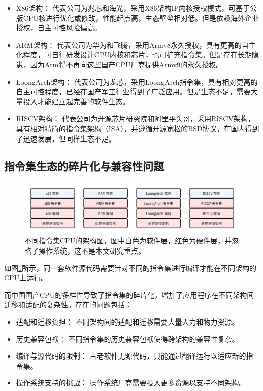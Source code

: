 \documentclass{Style/ucasproposal}%
\begin{document}
    \begin{itemize}
    \item {X86架构： } 代表公司为兆芯和海光，采用X86架构IP内核授权模式，可基于公版CPU核进行优化或修改，性能起点高，生态壁垒相对低。但是依赖海外企业授权，自主可控风险偏高。
    
    \item{ARM架构：} 代表公司为华为和飞腾，采用Armv8永久授权，具有更高的自主化程度，可自行研发设计CPU内核和芯片，也可扩充指令集。但是存在长期隐患，因为Arm将不再向这些国产CPU厂商提供Armv9的永久授权。
    
    \item{LoongArch架构：} 代表公司为龙芯，采用LoongArch指令集，具有相对更高的自主可控程度，已经在国产军工行业得到了广泛应用。但是生态不足，需要大量投入才能建立起完善的软件生态。
    
    \item{RISCV架构：} 代表公司为开源芯片研究院和阿里平头哥，采用RISCV架构，具有相对精简的指令集架构（ISA），并遵循开源宽松的BSD协议，在国内得到了迅速发展，但同样生态不足。
    \end{itemize}


\subsection{指令集生态的碎片化与兼容性问题}

\begin{figure}[h]
    \centering
    \includegraphics[width=1\linewidth]{./feishuImage/allCPU_arch.png}
    \caption{不同指令集CPU的架构图，图中白色为软件层，红色为硬件层，并忽略了操作系统，这不是本文研究重点。\protect\footnotemark}
    \label{img:allCPU_arch}
  \end{figure}


如图\ref{img:allCPU_arch}所示，同一套软件源代码需要针对不同的指令集进行编译才能在不同架构的CPU上运行。

    而中国国产CPU的多样性导致了指令集的碎片化，增加了应用程序在不同架构间迁移和适配的复杂性。存在的问题包括：
    \begin{itemize}
    \item 适配和迁移负担： 不同架构间的适配和迁移需要大量人力和物力资源。
    
    \item 历史兼容包袱： 不同指令集的历史兼容包袱使得跨架构的兼容性复杂。
    
    \item 编译与源代码的限制： 古老软件无源代码，只能通过翻译运行以适应新的指令集。
    
    \item 操作系统支持的挑战： 操作系统厂商需要投入更多资源以支持不同架构。
    \end{itemize}
\end{document}

